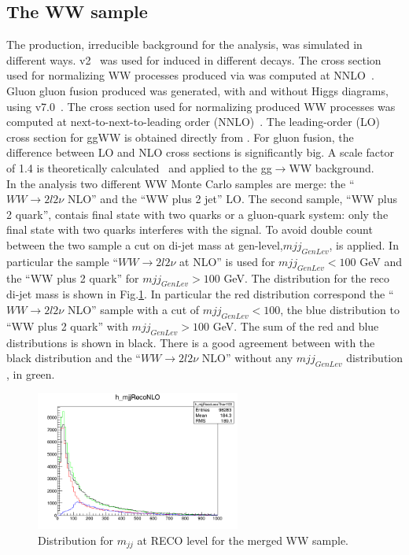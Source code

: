 \subsection*{The WW sample} The \WW production, irreducible background for the analysis, was simulated in different ways. 
\POWHEG v2~\cite{Melia:2011tj} was used for \qqbar induced \WW in different decays. 
The cross section used for normalizing WW processes produced via \qqbar was computed at NNLO~\cite{Gehrmann:2014fva}. 
Gluon gluon fusion produced \WW was generated, with and without Higgs diagrams, using \MCFM v7.0~\cite{Campbell:2013wga}. 
The cross section used for normalizing \qqbar produced WW processes was computed at next-to-next-to-leading order
(NNLO)~\cite{Gehrmann:2014fva}. The leading-order (LO) cross section for ggWW is obtained directly from \MCFM.
For gluon fusion, the difference between LO and NLO cross sections is significantly big.
A scale factor of 1.4 is theoretically calculated~\cite{Caola:2015rqy} and applied to the gg$\to$WW background. \\
In the analysis two different WW Monte Carlo samples are merge: the ``$WW \rightarrow 2l 2\nu$ NLO'' and the ``WW plus 2 jet'' LO.  
The second sample,  ``WW plus 2 quark'', contais final state with two quarks or a gluon-quark system: only the final state with two quarks interferes with the signal.
To avoid double count between the two sample a cut on di-jet mass at gen-level,$mjj_{GenLev}$, is applied. In particular the sample ``$WW \rightarrow 2l 2\nu$ at NLO'' is used for $mjj_{GenLev} <100$ GeV and the ``WW plus 2 quark'' for $mjj_{GenLev} >100$ GeV.
The  distribution for the reco di-jet mass is shown in Fig.\ref{fig:WW}. In particular the red distribution correspond the ``$WW \rightarrow 2l 2\nu$ NLO'' sample with a cut of  $mjj_{GenLev} <100$, the blue distribution to  ``WW plus 2 quark'' with $mjj_{GenLev} >100$ GeV. The sum of the red and blue distributions is shown in black. There is a good agreement between with the black distribution and the ``$WW \rightarrow 2l 2\nu$ NLO'' without any  $mjj_{GenLev}$ distribution , in green.
\begin{figure}[htbp]
\centering
\includegraphics[width=0.6\textwidth]{../AN/Figs/WW_distribution}
\caption{ Distribution for $m_{jj}$ at RECO level for the merged WW sample.}
    \label{fig:WW}
\end{figure}




